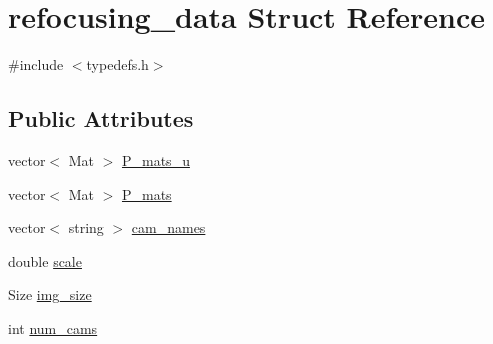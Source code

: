 \hypertarget{structrefocusing__data}{\section{refocusing\-\_\-data Struct Reference}
\label{d3/d46/structrefocusing__data}
}


{\ttfamily \#include $<$typedefs.\-h$>$}

\subsection*{Public Attributes}
\begin{DoxyCompactItemize}
\item 
vector$<$ Mat $>$ \hyperlink{structrefocusing__data_aea3885e85150df53e2c8d65203e7c0bf}{P\-\_\-mats\-\_\-u}
\item 
vector$<$ Mat $>$ \hyperlink{structrefocusing__data_a3cdccbbbf32a70f5049d6d4fa83fe6da}{P\-\_\-mats}
\item 
vector$<$ string $>$ \hyperlink{structrefocusing__data_a421d950a036ba0cb9682c138ad4db8d2}{cam\-\_\-names}
\item 
double \hyperlink{structrefocusing__data_af527d110a3aabac71d3c9a8a68de92eb}{scale}
\item 
Size \hyperlink{structrefocusing__data_aa42c7150b1f4a8e0805e124f7e03dc37}{img\-\_\-size}
\item 
int \hyperlink{structrefocusing__data_ab325738b480b6187ec23385eae36c78c}{num\-\_\-cams}
\end{DoxyCompactItemize}


